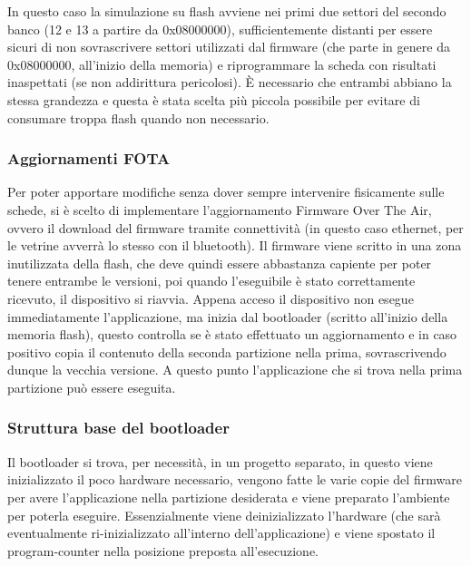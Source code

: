 In questo caso la simulazione su flash avviene nei primi due settori del secondo banco (12 e 13 a partire da 0x08000000), sufficientemente distanti per essere sicuri di non sovrascrivere settori utilizzati dal firmware (che parte in genere da 0x08000000, all'inizio della memoria) e riprogrammare la scheda con risultati inaspettati (se non addirittura pericolosi). \`E necessario che entrambi abbiano la stessa grandezza e questa \`e stata scelta pi\`u piccola possibile per evitare di consumare troppa flash quando non necessario.

\subsubsection{Aggiornamenti FOTA}

Per poter apportare modifiche senza dover sempre intervenire fisicamente sulle schede, si \`e scelto di implementare l'aggiornamento Firmware Over The Air, ovvero il download del firmware tramite connettivit\`a (in questo caso ethernet, per le vetrine avverr\`a lo stesso con il bluetooth). Il firmware viene scritto in una zona inutilizzata della flash, che deve quindi essere abbastanza capiente per poter tenere entrambe le versioni, poi quando l'eseguibile \`e stato correttamente ricevuto, il dispositivo si riavvia. Appena acceso il dispositivo non esegue immediatamente l'applicazione, ma inizia dal bootloader (scritto all'inizio della memoria flash), questo controlla se \`e stato effettuato un aggiornamento e in caso positivo copia il contenuto della seconda partizione nella prima, sovrascrivendo dunque la vecchia versione. A questo punto l'applicazione che si trova nella prima partizione pu\`o essere eseguita.

\subsubsection{Struttura base del bootloader}

Il bootloader si trova, per necessit\`a, in un progetto separato, in questo viene inizializzato il poco hardware necessario, vengono fatte le varie copie del firmware per avere l'applicazione nella partizione desiderata e viene preparato l'ambiente per poterla eseguire. Essenzialmente viene deinizializzato l'hardware (che sar\`a eventualmente ri-inizializzato all'interno dell'applicazione) e viene spostato il program-counter nella posizione preposta all'esecuzione.

